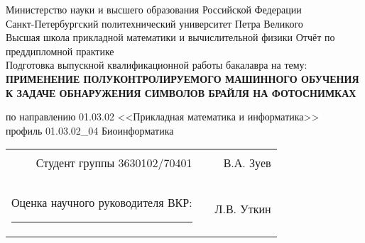 \documentclass{main.tex}[subfiles]
\begin{document}
\begin{titlepage}
\begin{center}
    Министерство науки и высшего образования Российской Федерации \\
    Санкт-Петербургский политехнический университет Петра Великого \\
    Высшая школа прикладной математики и вычислительной физики
    \vfill
    Отчёт по преддипломной практике\\
    Подготовка выпускной квалификационной работы бакалавра на тему:\\
    \vspace{.7\baselineskip}
    \large{\textbf{
            ПРИМЕНЕНИЕ ПОЛУКОНТРОЛИРУЕМОГО МАШИННОГО ОБУЧЕНИЯ
            К ЗАДАЧЕ ОБНАРУЖЕНИЯ СИМВОЛОВ БРАЙЛЯ НА ФОТОСНИМКАХ}}
\end{center}
\begin{center}
по направлению 01.03.02 <<Прикладная математика и информатика>> \\
профиль 01.03.02\_04 Биоинформатика
\end{center}

\vfill

\begin{tabular}{ rrr }
	Студент группы 3630102/70401 & \rule{3cm}{0.15mm} & В.А. Зуев\\
	&&\\
	Оценка научного руководителя ВКР: \rule{1cm}{0.15mm}  & \rule{3cm}{0.15mm} &  Л.В. Уткин\\
\end{tabular}


\vfill

\end{titlepage}
\end{document}
